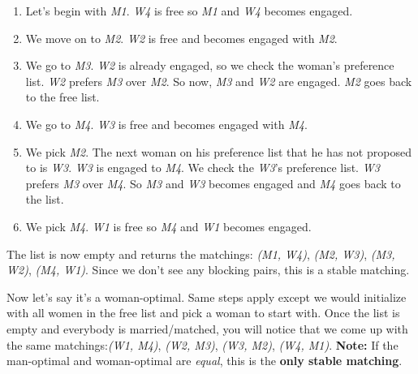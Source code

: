 \documentclass[twoside]{article}
\begin{document}
\begin{enumerate}
\item Let's begin with \textit{M1}. \textit{W4} is free so \textit{M1} and \textit{W4} becomes engaged. 
\item We move on to \textit{M2}. \textit{W2} is free and becomes engaged with \textit{M2}.
\item We go to \textit{M3}. \textit{W2} is already engaged, so we check the woman's preference list. \textit{W2} prefers \textit{M3} over \textit{M2}. So now, \textit{M3} and \textit{W2} are engaged. \textit{M2} goes back to the free list.
\item We go to \textit{M4}. \textit{W3} is free and becomes engaged with \textit{M4}.
\item We pick \textit{M2}. The next woman on his preference list that he has not proposed to is \textit{W3}. \textit{W3} is engaged to \textit{M4}. We check the \textit{W3}'s preference list. \textit{W3} prefers \textit{M3} over \textit{M4}. So \textit{M3} and \textit{W3} becomes engaged and \textit{M4} goes back to the list.
\item We pick \textit{M4}. \textit{W1} is free so \textit{M4} and \textit{W1} becomes engaged.
\end{enumerate}
The list is now empty and returns the matchings: \textit{(M1, W4)}, \textit{(M2, W3)}, \textit{(M3, W2)}, \textit{(M4, W1)}. Since we don't see any blocking pairs, this is a stable matching.

Now let's say it's a woman-optimal. Same steps apply except we would initialize with all women in the free list and pick a woman to start with. Once the list is empty and everybody is married/matched, you will notice that we come up with the same matchings:\textit{(W1, M4)}, \textit{(W2, M3)}, \textit{(W3, M2)}, \textit{(W4, M1)}.\newline \newline
\textbf{Note:} If the man-optimal and woman-optimal are \textit{equal}, this is the \textbf{only stable matching}.
\end{document}
